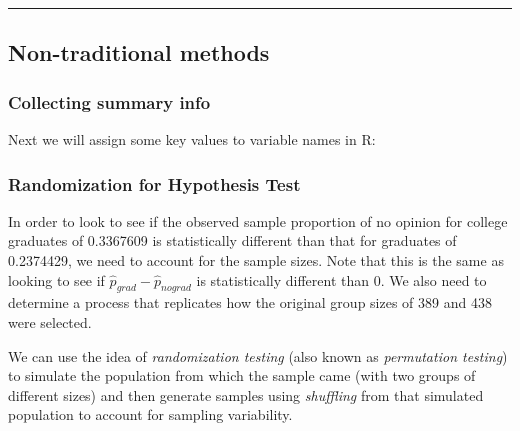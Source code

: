 \documentclass[]{tufte-book}
\newenvironment{Shaded}{\begin{snugshade}}{\end{snugshade}}
\newcommand{\DecValTok}[1]{\textcolor[rgb]{0.00,0.00,0.81}{{#1}}}
\newcommand{\StringTok}[1]{\textcolor[rgb]{0.31,0.60,0.02}{{#1}}}
\newcommand{\NormalTok}[1]{{#1}}
\let\oldrule=\rule
\renewcommand{\rule}[1]{\oldrule{\linewidth}}
\begin{document}
\begin{center}\rule{0.5\linewidth}{\linethickness}\end{center}

\subsection{Non-traditional methods}\label{non-traditional-methods-2}

\subsubsection{Collecting summary info}\label{collecting-summary-info}

Next we will assign some key values to variable names in R:

\begin{Shaded}
\end{Shaded}

\subsubsection{Randomization for Hypothesis
Test}\label{randomization-for-hypothesis-test}

In order to look to see if the observed sample proportion of no opinion
for college graduates of 0.3367609 is statistically different than that
for graduates of 0.2374429, we need to account for the sample sizes.
Note that this is the same as looking to see if
\(\hat{p}_{grad} - \hat{p}_{nograd}\) is statistically different than 0.
We also need to determine a process that replicates how the original
group sizes of 389 and 438 were selected.

We can use the idea of \emph{randomization testing} (also known as
\emph{permutation testing}) to simulate the population from which the
sample came (with two groups of different sizes) and then generate
samples using \emph{shuffling} from that simulated population to account
for sampling variability.
\end{document}
